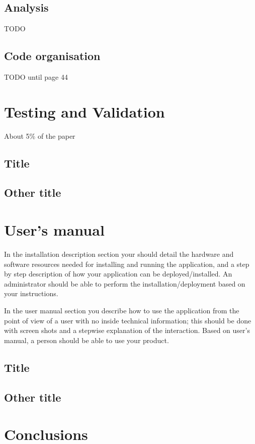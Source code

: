 \documentclass[12pt,a4paper,twoside]{report}
\begin{document}
\section{Analysis}
{\color{red} TODO
}\section{Code organisation}
{\color{red} TODO until page 44
}

\chapter{Testing and Validation}

About 5\% of the paper
\section{Title}
\section{Other title}

\chapter{User's manual}

In the installation description section your should detail the hardware and software resources needed for installing and running the application, and a step by step description of how your application can be deployed/installed. An administrator should be able to perform the installation/deployment based on your instructions.

In the user manual section you describe how to use the application from the point of view of a user with no inside technical information; this should be done with screen shots and a stepwise explanation of the interaction. Based on user's manual, a person should be able to use your product.

\section{Title}
\section{Other title}

\chapter{Conclusions}
\end{document}
